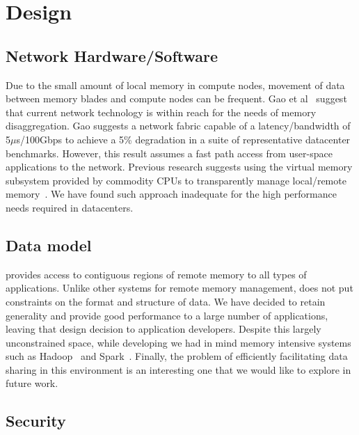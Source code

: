 \section{\System Design}
\label{sec:design}



\subsection{Network Hardware/Software}

Due to the small amount of local memory in compute nodes, movement of data between memory blades and compute nodes can be frequent. Gao et al~\cite{gao} suggest that current network technology is within reach for the needs of memory disaggregation. Gao suggests a network fabric capable of a latency/bandwidth of 5$\mu$s/100Gbps to achieve a 5\% degradation in a suite of representative datacenter benchmarks. However, this result assumes a fast path access from user-space applications to the network. Previous research suggests using the virtual memory subsystem provided by commodity CPUs to transparently manage local/remote memory~\cite{disag_isca}. 
We have found such approach inadequate for the high performance needs required in datacenters. 

\subsection{Data model}

\System provides access to contiguous regions of remote memory to all types of applications. Unlike other systems \cite{ramcloud, farm} for remote memory management, \System does not put constraints on the format and structure of data. We have decided to retain generality and provide good performance to a large number of applications, leaving that design decision to application developers. Despite this largely unconstrained space, while developing \System we had in mind memory intensive systems such as Hadoop~\cite{hadoop_mr} and Spark~\cite{spark}. Finally, the problem of efficiently facilitating data sharing in this environment is an interesting one that we would like to explore in future work.

\subsection{Security}

